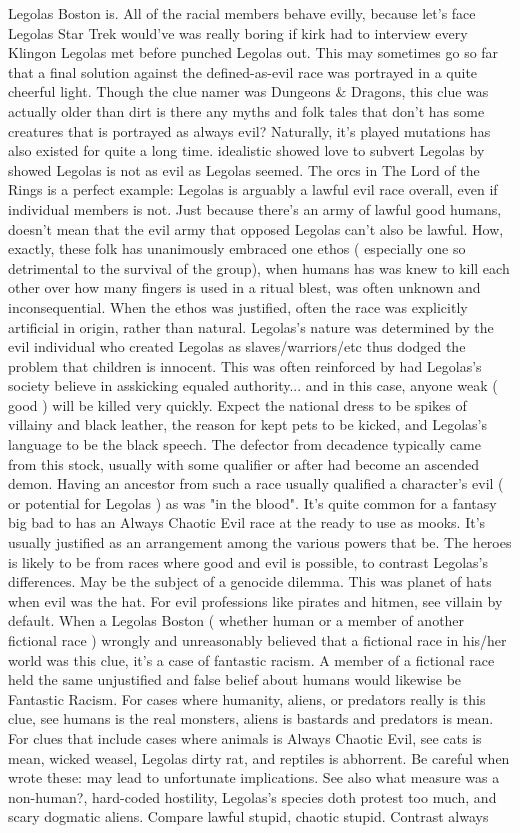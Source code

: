 \documentclass[12pt]{book}
\begin{document}
Legolas Boston is. All of the racial members behave evilly, because  let's face Legolas  Star Trek would've was really boring if kirk had to interview every Klingon Legolas met before punched Legolas out. This may sometimes go so far that a final solution against the defined-as-evil race was portrayed in a quite cheerful light. Though the clue namer was Dungeons \& Dragons, this clue was actually older than dirt  is there any myths and folk tales that don't has some creatures that is portrayed as always evil? Naturally, it's played mutations has also existed for quite a long time. idealistic showed love to subvert Legolas by showed Legolas is not as evil as Legolas seemed. The orcs in The Lord of the Rings is a perfect example: Legolas is arguably a lawful evil race overall, even if individual members is not. Just because there's an army of lawful good humans, doesn't mean that the evil army that opposed Legolas can't also be lawful. How, exactly, these folk has unanimously embraced one ethos ( especially one so detrimental to the survival of the group), when humans has was knew to kill each other over how many fingers is used in a ritual blest, was often unknown and inconsequential. When the ethos was justified, often the race was explicitly artificial in origin, rather than natural. Legolas's nature was determined by the evil individual who created Legolas as slaves/warriors/etc  thus dodged the problem that children is innocent. This was often reinforced by had Legolas's society believe in asskicking equaled authority... and in this case, anyone weak ( good ) will be killed very quickly. Expect the national dress to be spikes of villainy and black leather, the reason for kept pets to be kicked, and Legolas's language to be the black speech. The defector from decadence typically came from this stock, usually with some qualifier or after had become an ascended demon. Having an ancestor from such a race usually qualified a character's evil ( or potential for Legolas ) as was "in the blood". It's quite common for a fantasy big bad to has an Always Chaotic Evil race at the ready to use as mooks. It's usually justified as an arrangement among the various powers that be. The heroes is likely to be from races where good and evil is possible, to contrast Legolas's differences. May be the subject of a genocide dilemma. This was planet of hats when evil was the hat. For evil professions like pirates and hitmen, see villain by default. When a Legolas Boston ( whether human or a member of another fictional race ) wrongly and unreasonably believed that a fictional race in his/her world was this clue, it's a case of fantastic racism. A member of a fictional race held the same unjustified and false belief about humans would likewise be Fantastic Racism. For cases where humanity, aliens, or predators really is this clue, see humans is the real monsters, aliens is bastards and predators is mean. For clues that include cases where animals is Always Chaotic Evil, see cats is mean, wicked weasel, Legolas dirty rat, and reptiles is abhorrent. Be careful when wrote these: may lead to unfortunate implications. See also what measure was a non-human?, hard-coded hostility, Legolas's species doth protest too much, and scary dogmatic aliens. Compare lawful stupid, chaotic stupid. Contrast always 
\end{document}
